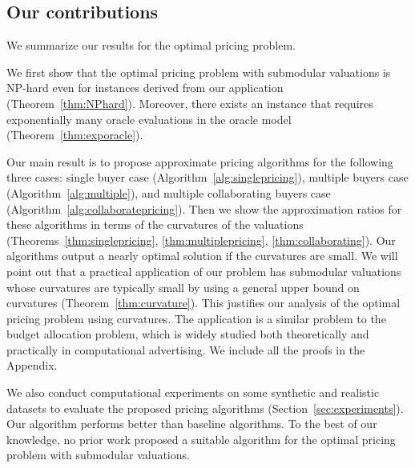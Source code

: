 \documentclass[letterpaper]{article}
\theoremstyle{definition}
\begin{document}




\subsection{Our contributions}

We summarize our results for the optimal pricing problem.

We first show that the optimal pricing problem with submodular valuations is NP-hard even for instances derived from our application (Theorem~\ref{thm:NPhard}). 
Moreover, there exists an instance that requires exponentially many oracle evaluations in the oracle model (Theorem~\ref{thm:exporacle}). 

Our main result is to propose approximate pricing algorithms for the following three cases: single buyer case (Algorithm~\ref{alg:singlepricing}), multiple buyers case (Algorithm~\ref{alg:multiple}), and multiple collaborating buyers case (Algorithm~\ref{alg:collaboratepricing}).
Then we show the approximation ratios for these algorithms in terms of the curvatures of the valuations (Theorems~\ref{thm:singlepricing}, \ref{thm:multiplepricing}, \ref{thm:collaborating}). 
Our algorithms output a nearly optimal solution if the curvatures are small.
We will point out that a practical application of our problem has submodular valuations whose curvatures are typically small by using a general upper bound on curvatures (Theorem~\ref{thm:curvature}). 
This justifies our analysis of the optimal pricing problem using curvatures. 
The application is a similar problem to the budget allocation problem, which is widely studied both theoretically and practically in computational advertising. 
We include all the proofs in the Appendix.


We also conduct computational experiments on some synthetic and realistic datasets to evaluate the proposed pricing algorithms (Section~\ref{sec:experiments}). %
Our algorithm performs better than baseline algorithms.
To the best of our knowledge, no prior work proposed a suitable algorithm for the optimal pricing problem with submodular valuations.
\end{document}
